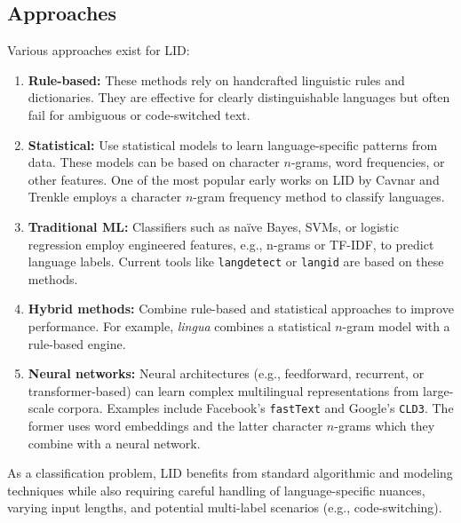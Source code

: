 \subsection{Approaches}\label{subsec:approaches}
Various approaches exist for LID:
\begin{enumerate}
    \item \textbf{Rule-based:} These methods rely on handcrafted linguistic rules and dictionaries. They are effective for clearly distinguishable languages but often fail for ambiguous or code-switched text.
    \item \textbf{Statistical:} Use statistical models to learn language-specific patterns from data. These models can be based on character $n$-grams, word frequencies, or other features. One of the most popular early works on LID by Cavnar and Trenkle employs a character $n$-gram frequency method to classify languages. \cite{CavnarTrenkle1994}
    \item \textbf{Traditional ML:} Classifiers such as naïve Bayes, SVMs, or logistic regression employ engineered features, e.g., n-grams or TF-IDF, to predict language labels. Current tools like \texttt{langdetect} or \texttt{langid} are based on these methods. \cite{Nakatani2010, LuiBaldwin2012}
    \item \textbf{Hybrid methods:} Combine rule-based and statistical approaches to improve performance. For example, \textit{lingua} combines a statistical $n$-gram model with a rule-based engine. \cite{Lingua2025}
    \item \textbf{Neural networks:} Neural architectures (e.g., feedforward, recurrent, or transformer-based) can learn complex multilingual representations from large-scale corpora. Examples include Facebook's \texttt{fastText} and Google's \texttt{CLD3}. The former uses word embeddings and the latter character $n$-grams which they combine with a neural network. \cite{JoulinEtAl2016, GoogleCLD3}
\end{enumerate}
As a classification problem, LID benefits from standard algorithmic and modeling techniques while also requiring careful handling of language-specific nuances, varying input lengths, and potential multi-label scenarios (e.g., code-switching). 
